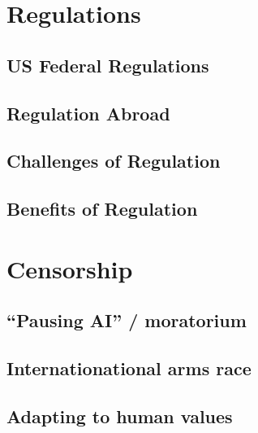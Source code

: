 \documentclass[
]{book}
\begin{document}
\hypertarget{regulations}{%
\chapter{Regulations}\label{regulations}}

\hypertarget{us-federal-regulations}{%
\section{US Federal Regulations}\label{us-federal-regulations}}

\hypertarget{regulation-abroad}{%
\section{Regulation Abroad}\label{regulation-abroad}}

\hypertarget{challenges-of-regulation}{%
\section{Challenges of Regulation}\label{challenges-of-regulation}}

\hypertarget{benefits-of-regulation}{%
\section{Benefits of Regulation}\label{benefits-of-regulation}}

\hypertarget{censorship}{%
\chapter{Censorship}\label{censorship}}

\hypertarget{pausing-ai-moratorium}{%
\section{``Pausing AI'' / moratorium}\label{pausing-ai-moratorium}}

\hypertarget{internationational-arms-race}{%
\section{Internationational arms race}\label{internationational-arms-race}}

\hypertarget{adapting-to-human-values}{%
\section{Adapting to human values}\label{adapting-to-human-values}}
\end{document}
